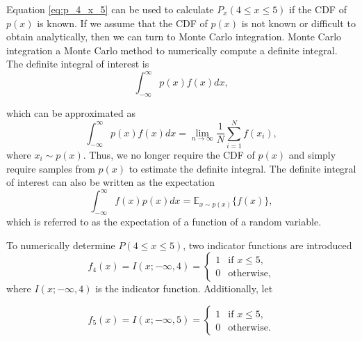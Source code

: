 \documentclass{article}
\begin{document}
Equation \eqref{eq:p_4_x_5} can be used to calculate $P_x(4 \leq x \leq 5)$ if the CDF of $p(x)$ is known. If we assume that the CDF of $p(x)$ is not known or difficult to obtain analytically, then we can turn to Monte Carlo integration. Monte Carlo integration a Monte Carlo method to numerically compute a definite integral. The definite integral of interest is
\begin{equation}
    \int_{-\infty}^{\infty} p(x)f(x)dx,
\end{equation}

which can be approximated as
\begin{equation}\label{eq:MonteCarlo}
\int_{-\infty}^{\infty}p(x)f(x)dx = \lim_{n \rightarrow \infty} \frac{1}{N} \sum_{i=1}^{N} f(x_i),
\end{equation}
where $x_i \sim p(x)$. Thus, we no longer require the CDF of $p(x)$ and simply require samples from $p(x)$ to estimate the definite integral. The definite integral of interest can also be written as the expectation
\begin{equation}
    \int_{-\infty}^{\infty}f(x)p(x)dx = \mathbb{E}_{x\sim p(x)}\{ f(x) \},
\end{equation}
which is referred to as the expectation of a function of a random variable.

To numerically determine $P(4 \leq x \leq 5)$, two indicator functions are introduced
\begin{equation}
f_4(x) = I(x; -\infty, 4) = \begin{cases} 
1 & \text{if } x \leq 5, \\
0 & \text{otherwise,}
\end{cases}
\end{equation}
where $I(x; -\infty, 4)$ is the indicator function. Additionally, let 

\begin{equation}
f_5(x) = I(x; -\infty, 5) = \begin{cases} 
1 & \text{if } x \leq 5, \\
0 & \text{otherwise.}
\end{cases}
\end{equation}
\end{document}
